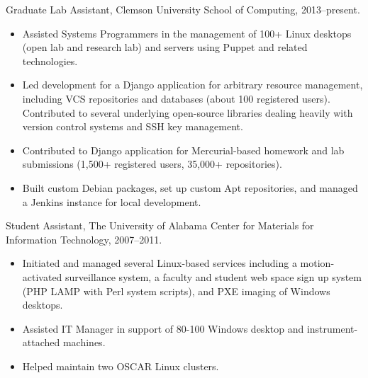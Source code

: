 Graduate Lab Assistant, Clemson University School of Computing, 2013--present.

\begin{itemize}
  \item Assisted Systems Programmers in the management of 100+ Linux desktops
        (open lab and research lab) and servers using Puppet and related
        technologies.
  \item Led development for a Django application for arbitrary resource
        management, including VCS repositories and databases (about 100
        registered users). Contributed to several underlying open-source
        libraries dealing heavily with version control systems and SSH key
        management.
  \item Contributed to Django application for Mercurial-based homework and lab
        submissions (1,500+ registered users, 35,000+ repositories).
  \item Built custom Debian packages, set up custom Apt repositories, and
        managed a Jenkins instance for local development.
\end{itemize}


Student Assistant, The University of Alabama Center for Materials for
Information Technology, 2007--2011.

\begin{itemize}
  \item Initiated and managed several Linux-based services including a
        motion-activated surveillance system, a faculty and student web space
        sign up system (PHP LAMP with Perl system scripts), and PXE imaging of
        Windows desktops.
  \item Assisted IT Manager in support of 80-100 Windows desktop and
        instrument-attached machines.
  \item Helped maintain two OSCAR Linux clusters.
\end{itemize}
